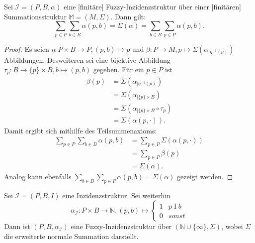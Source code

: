 \documentclass{article}
\begin{document}
\begin{theorem}
  Sei  $\mathcal{I} = (P, B, \alpha)$ eine [finitäre] Fuzzy-Inzidenzstruktur über einer [finitären]
  Summationsstruktur $\mathbb{M} = (M, \Sigma)$.
  Dann gilt:
  \begin{equation*}
    \sum_{p \in P}\sum_{b \in B}\alpha(p, b) = \Sigma(\alpha) = \sum_{b \in B}\sum_{p \in P}\alpha(p, b).
  \end{equation*}
\end{theorem}
\begin{proof}
  Es seien $\eta \colon P \times B \to P, (p, b) \mapsto p$ und
  $\beta \colon P \to M, p \mapsto \Sigma(\alpha_{\mid \eta^{-1}(p)})$ Abbildungen.
  Desweiteren sei eine bijektive Abbildung $\tau_p \colon B \to \{p\} \times B, b \mapsto (p, b)$ gegeben.
  Für ein $p \in P$ ist
  \begin{align*}
    \beta(p) &= \Sigma(\alpha_{\mid \eta^{-1}(p)}) \\
    &= \Sigma(\alpha_{\mid \{p\} \times B}) \\
    &= \Sigma(\alpha_{\mid \{p\} \times B} \circ \tau_p) \\
    &= \Sigma(\alpha(p, \cdot)).
  \end{align*}
  Damit ergibt sich mithilfe des Teilsummenaxioms:
  \begin{align*}
    \sum_{p \in P}\sum_{b \in B}\alpha(p, b) &= \sum_{p \in P}\Sigma(\alpha(p, \cdot)) \\
    &= \sum_{p \in P}\beta(p) \\
    &= \Sigma(\alpha).
  \end{align*}
  Analog kann ebenfalls $\sum_{b \in B}\sum_{p \in P}\alpha(p, b) = \Sigma(\alpha)$ gezeigt werden.
\end{proof}

\begin{definition}
  Sei $\mathcal{I} = (P, B, I)$ eine Inzidenzstruktur.
  Sei weiterhin
  \begin{equation*}
    \alpha_{\mathcal{I}} \colon P \times B \to \mathbb{N}, (p, b) \mapsto
    \begin{cases}
      1 & p \mathrel{I} b \\
      0 & sonst
    \end{cases}
  \end{equation*}
  Dann ist $(P, B, \alpha_{\mathcal{I}})$ eine Fuzzy-Inzidenzstruktur über $(\mathbb{N} \cup \{\infty\}, \Sigma)$,
  wobei $\Sigma$ die erweiterte normale Summation darstellt.
\end{definition}
\end{document}
